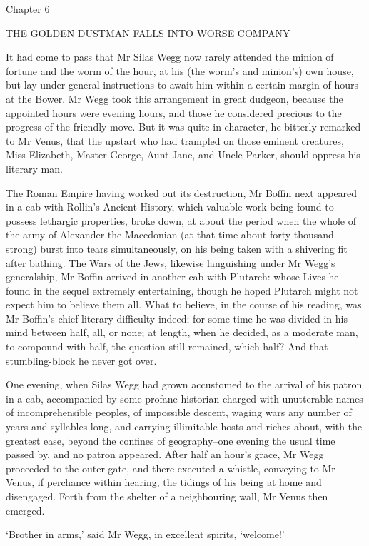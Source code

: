 Chapter 6

THE GOLDEN DUSTMAN FALLS INTO WORSE COMPANY


It had come to pass that Mr Silas Wegg now rarely attended the minion of
fortune and the worm of the hour, at his (the worm’s and minion’s) own
house, but lay under general instructions to await him within a certain
margin of hours at the Bower. Mr Wegg took this arrangement in great
dudgeon, because the appointed hours were evening hours, and those he
considered precious to the progress of the friendly move. But it was
quite in character, he bitterly remarked to Mr Venus, that the upstart
who had trampled on those eminent creatures, Miss Elizabeth, Master
George, Aunt Jane, and Uncle Parker, should oppress his literary man.

The Roman Empire having worked out its destruction, Mr Boffin next
appeared in a cab with Rollin’s Ancient History, which valuable work
being found to possess lethargic properties, broke down, at about the
period when the whole of the army of Alexander the Macedonian (at that
time about forty thousand strong) burst into tears simultaneously, on
his being taken with a shivering fit after bathing. The Wars of the
Jews, likewise languishing under Mr Wegg’s generalship, Mr Boffin
arrived in another cab with Plutarch: whose Lives he found in the sequel
extremely entertaining, though he hoped Plutarch might not expect him to
believe them all. What to believe, in the course of his reading, was Mr
Boffin’s chief literary difficulty indeed; for some time he was divided
in his mind between half, all, or none; at length, when he decided, as a
moderate man, to compound with half, the question still remained, which
half? And that stumbling-block he never got over.

One evening, when Silas Wegg had grown accustomed to the arrival of
his patron in a cab, accompanied by some profane historian charged with
unutterable names of incomprehensible peoples, of impossible descent,
waging wars any number of years and syllables long, and carrying
illimitable hosts and riches about, with the greatest ease, beyond the
confines of geography--one evening the usual time passed by, and no
patron appeared. After half an hour’s grace, Mr Wegg proceeded to the
outer gate, and there executed a whistle, conveying to Mr Venus,
if perchance within hearing, the tidings of his being at home and
disengaged. Forth from the shelter of a neighbouring wall, Mr Venus then
emerged.

‘Brother in arms,’ said Mr Wegg, in excellent spirits, ‘welcome!’

